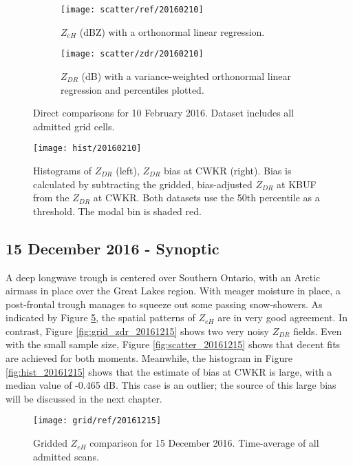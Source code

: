 \begin{figure}[H]
\centering
   \begin{subfigure}[t]{0.48\linewidth} \centering
     \texttt{[image: scatter/ref/20160210]}
     \caption{$Z_{eH}$ (dBZ) with a orthonormal linear regression.}\label{fig:scatter_ref_20160210}
   \end{subfigure}
   \begin{subfigure}[t]{0.48\linewidth} \centering
     \texttt{[image: scatter/zdr/20160210]}
     \caption{$Z_{DR}$ (dB) with a variance-weighted orthonormal linear regression and percentiles plotted.}\label{fig:scatter_zdr_20160210}
   \end{subfigure}
\caption{Direct comparisons for 10 February 2016. Dataset includes all admitted grid cells.} \label{fig:scatter_20160210}
\end{figure}

\begin{figure}[H]
\texttt{[image: hist/20160210]}\centering
\caption{Histograms of $Z_{DR}$ (left), $Z_{DR}$ bias at CWKR (right). Bias is calculated by subtracting the gridded, bias-adjusted $Z_{DR}$ at KBUF from the
$Z_{DR}$ at CWKR. Both datasets use the 50th percentile as a threshold. The modal bin is shaded red.} 
\label{fig:hist_20160210}
\end{figure}

\subsection{15 December 2016 - Synoptic}
A deep longwave trough is centered over Southern Ontario, with an Arctic airmass in place over the Great Lakes region. With meager moisture in place, a
post-frontal trough manages to squeeze out some passing snow-showers. As indicated by Figure \ref{fig:grid_ref_20161215}, the spatial patterns of $Z_{eH}$ are in very good agreement. In contrast, Figure \ref{fig:grid_zdr_20161215} shows two very noisy $Z_{DR}$ fields. Even with the small sample size, Figure \ref{fig:scatter_20161215} shows that decent fits are achieved for both moments. Meanwhile, the histogram in Figure \ref{fig:hist_20161215} shows that the estimate of bias at CWKR is large, with a median value of -0.465 dB. This case is an outlier; the source of this large bias will be discussed in the next chapter. 
\begin{figure}[p]
\texttt{[image: grid/ref/20161215]}
\caption{Gridded $Z_{eH}$ comparison for 15 December 2016. Time-average of all admitted scans.} 
\label{fig:grid_ref_20161215}
\end{figure}

